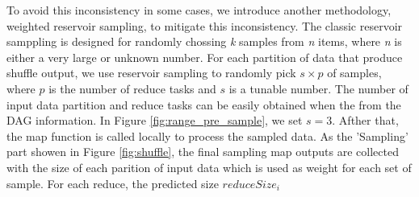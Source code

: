 \documentclass[10pt,twocolumn]{article}
\begin{document}
To avoid this inconsistency in some cases, we introduce another methodology, weighted reservoir sampling, to mitigate this inconsistency. The classic reservoir samppling is designed for randomly chossing \textit{k} samples from \textit{n} items, where \textit{n} is either a very large or unknown number\cite{reservoir}. For each partition of data that produce shuffle output, we use reservoir sampling to randomly pick $s \times p$ of samples, where $p$ is the number of reduce tasks and $s$ is a tunable number. The number of input data partition and reduce tasks can be easily obtained when the from the DAG information. In Figure \ref{fig:range_pre_sample}, we set $s = 3$. Afther that, the map function is called locally to process the sampled data. As the 'Sampling' part showen in Figure \ref{fig:shuffle}, the final sampling map outputs are collected with the size of each parition of input data which is used as weight for each set of sample. For each reduce, the predicted size $reduceSize_i$
\end{document}
